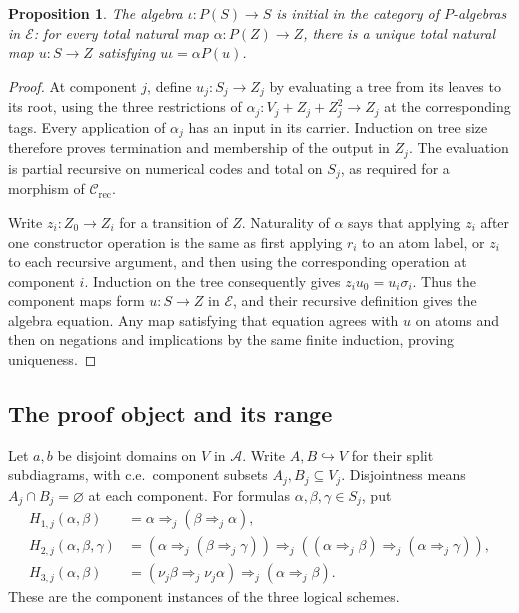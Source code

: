 \documentclass[11pt]{article}
\newtheorem{proposition}[theorem]{Proposition}
\begin{document}
\begin{proposition}\label{prop:fork-syntax-initial}
The algebra $\iota:P(S)\to S$ is initial in the category of
$P$-algebras in $\mathcal E$: for every total natural map
$\alpha:P(Z)\to Z$, there is a unique total natural map
$u:S\to Z$ satisfying $u\iota=\alpha P(u)$.
\end{proposition}
\begin{proof}
At component $j$, define $u_j:S_j\to Z_j$ by evaluating a tree
from its leaves to its root, using the three restrictions of
$\alpha_j:V_j+Z_j+Z_j^2\to Z_j$ at the corresponding tags.
Every application of $\alpha_j$ has an input in its carrier.
Induction on tree size therefore proves termination and membership
of the output in $Z_j$. The evaluation is partial recursive on
numerical codes and total on $S_j$, as required for a morphism of
$\mathcal C_{\mathrm{rec}}$.

Write $z_i:Z_0\to Z_i$ for a transition of $Z$. Naturality of
$\alpha$ says that applying $z_i$ after one constructor operation
is the same as first applying $r_i$ to an atom label, or $z_i$
to each recursive argument, and then using the corresponding
operation at component $i$. Induction on the tree consequently
gives $z_i u_0=u_i\sigma_i$. Thus the component maps form
$u:S\to Z$ in $\mathcal E$, and their recursive definition gives
the algebra equation. Any map satisfying that equation agrees
with $u$ on atoms and then on negations and implications by the
same finite induction, proving uniqueness.
\end{proof}

\subsection{The proof object and its range}

Let $a,b$ be disjoint domains on $V$ in $\mathcal A$.
Write $A,B\hookrightarrow V$ for their split subdiagrams, with
c.e.\ component subsets $A_j,B_j\subseteq V_j$. Disjointness
means $A_j\cap B_j=\varnothing$ at each component.
For formulas $\alpha,\beta,\gamma\in S_j$, put
\begin{align*}
 H_{1,j}(\alpha,\beta)
   &=\alpha\Rightarrow_j(\beta\Rightarrow_j\alpha),\\
 H_{2,j}(\alpha,\beta,\gamma)
   &=(\alpha\Rightarrow_j(\beta\Rightarrow_j\gamma))
     \Rightarrow_j((\alpha\Rightarrow_j\beta)
                          \Rightarrow_j(\alpha\Rightarrow_j\gamma)),\\
 H_{3,j}(\alpha,\beta)
   &=(\nu_j\beta\Rightarrow_j\nu_j\alpha)
                          \Rightarrow_j(\alpha\Rightarrow_j\beta).
\end{align*}
These are the component instances of the three logical schemes.
\end{document}
